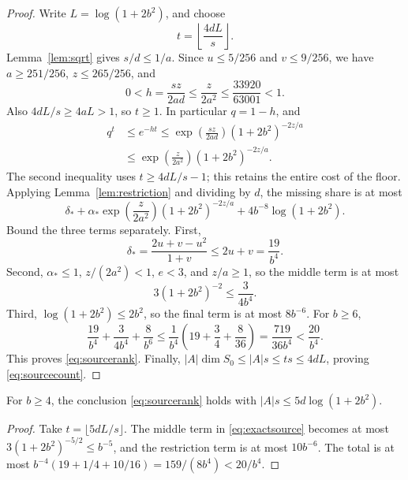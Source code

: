 \begin{proof}
Write \(L=\log(1+2b^2)\), and choose
\[
 t=\left\lfloor\frac{4dL}{s}\right\rfloor.
\]
Lemma~\ref{lem:sqrt} gives \(s/d\le1/a\). Since
\(u\le5/256\) and \(v\le9/256\), we have
\(a\ge251/256\), \(z\le265/256\), and
\[
 0<h=\frac{s z}{2ad}\le\frac{z}{2a^2}
 \le\frac{33920}{63001}<1.
\]
Also \(4dL/s\ge4aL>1\), so \(t\ge1\).
In particular \(q=1-h\), and
\begin{align*}
 q^t&\le e^{-ht}
 \le \exp\left(\frac{s z}{2ad}\right)
       (1+2b^2)^{-2z/a}\\
 &\le \exp\left(\frac{z}{2a^2}\right)
       (1+2b^2)^{-2z/a}.
\end{align*}
The second inequality uses \(t\ge4dL/s-1\); this retains the
entire cost of the floor. Applying Lemma~\ref{lem:restriction}
and dividing by \(d\), the missing share is at most
\begin{equation}\label{eq:exactsource}
 \delta_*+
 \alpha_*\exp\left(\frac{z}{2a^2}\right)
       (1+2b^2)^{-2z/a}
 +4b^{-8}\log(1+2b^2).
\end{equation}
Bound the three terms separately. First,
\[
 \delta_*=\frac{2u+v-u^2}{1+v}\le2u+v=\frac{19}{b^4}.
\]
Second, \(\alpha_*\le1\), \(z/(2a^2)<1\), \(e<3\),
and \(z/a\ge1\), so the middle term is at most
\[
 3(1+2b^2)^{-2}\le\frac3{4b^4}.
\]
Third, \(\log(1+2b^2)\le2b^2\), so the final term is at most
\(8b^{-6}\). For \(b\ge6\),
\[
 \frac{19}{b^4}+\frac3{4b^4}+\frac8{b^6}
 \le\frac1{b^4}\left(19+\frac34+\frac8{36}\right)
 =\frac{719}{36b^4}<\frac{20}{b^4}.
\]
This proves \eqref{eq:sourcerank}. Finally,
\(|A|\dim S_0\le |A|s\le ts\le4dL\), proving
\eqref{eq:sourcecount}.
\end{proof}

\begin{corollary}\label{cor:five}
For \(b\ge4\), the conclusion \eqref{eq:sourcerank} holds with
\(|A|s\le5d\log(1+2b^2)\).
\end{corollary}
\begin{proof}
Take \(t=\lfloor5dL/s\rfloor\). The middle term in
\eqref{eq:exactsource} becomes at most
\(3(1+2b^2)^{-5/2}\le b^{-5}\), and the restriction term is
at most \(10b^{-6}\). The total is at most
\(b^{-4}(19+1/4+10/16)=159/(8b^4)<20/b^4\).
\end{proof}

